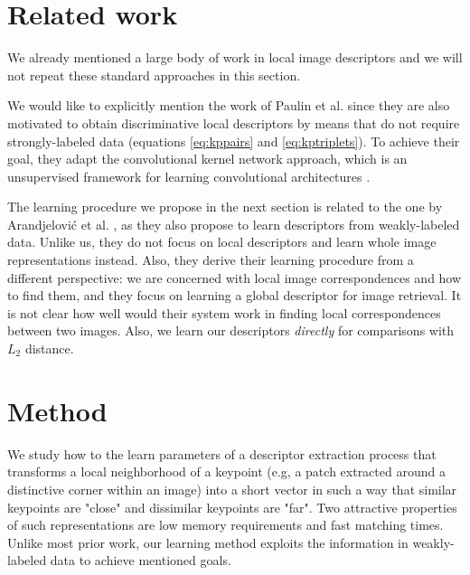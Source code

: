 \documentclass[10pt,conference,a4paper]{IEEEtran}
\begin{document}
	\section{Related work}
		We already mentioned a large body of work in local image descriptors and we will not repeat these standard approaches in this section.

		We would like to explicitly mention the work of Paulin et al. \cite{kernelconv} since they are also motivated to obtain discriminative local descriptors by means that do not require strongly-labeled data (equations \eqref{eq:kppairs} and \eqref{eq:kptriplets}).
		To achieve their goal, they adapt the convolutional kernel network approach, which is an unsupervised framework for learning convolutional architectures \cite{kernelconv0}.

		The learning procedure we propose in the next section is related to the one by Arandjelovi\'{c} et al. \cite{netvlad}, as they also propose to learn descriptors from weakly-labeled data.
		Unlike us, they do not focus on local descriptors and learn whole image representations instead.
		Also, they derive their learning procedure from a different perspective: we are concerned with local image correspondences and how to find them, and they focus on learning a global descriptor for image retrieval.
		It is not clear how well would their system work in finding local correspondences between two images.
		Also, we learn our descriptors \textit{directly} for comparisons with $L_2$ distance.

	\section{Method}\label{sec:core}
		We study how to the learn parameters of a descriptor extraction process that transforms a local neighborhood of a keypoint (e.g, a patch extracted around a distinctive corner within an image) into a short vector in such a way that similar keypoints are "close" and dissimilar keypoints are "far".
		Two attractive properties of such representations are low memory requirements and fast matching times.
		Unlike most prior work, our learning method exploits the information in weakly-labeled data to achieve mentioned goals.
\end{document}
